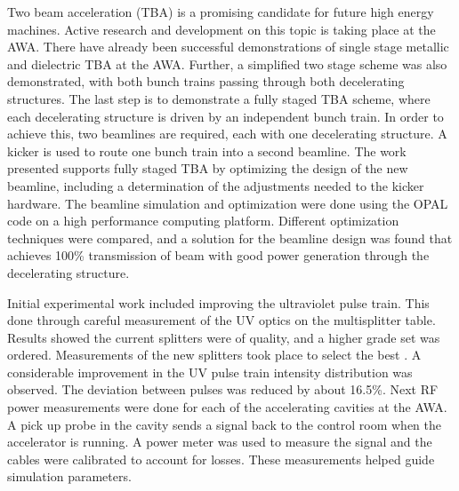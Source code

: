 
Two beam acceleration (TBA) is a promising candidate for future high energy machines. Active research and development on this topic is taking place at the AWA. There have already been successful demonstrations of single stage metallic and dielectric 
TBA at the AWA. Further, a simplified two stage scheme was also demonstrated, with both bunch trains passing through both decelerating structures. 
The last step is to demonstrate a fully staged TBA scheme, where each decelerating structure is driven by an independent bunch train.  In order to achieve this, two beamlines are required, each with one decelerating structure.   A kicker is used to route one bunch train into a second beamline. The work presented supports fully staged TBA by optimizing the design of the new beamline, including a determination of the adjustments needed to the kicker hardware.  The beamline simulation and optimization were done using the OPAL code on a high performance computing platform.  Different optimization techniques were compared, and a solution for the beamline design was found that achieves 100\% transmission of beam with good power generation through the decelerating structure. 

Initial experimental work included improving the ultraviolet pulse train. This  done through careful measurement of the UV optics on the multisplitter table. Results showed the current splitters were of  quality, and a higher grade set was ordered. Measurements of the new splitters  took place 
to select the best . 
A considerable improvement in the UV pulse train intensity distribution was observed. The deviation between pulses was reduced by about 16.5\%.
Next RF power measurements were done for each of the accelerating 
cavities at the AWA. A pick up probe in the cavity sends a signal back to the control room when the accelerator is running. A power meter was used to measure the signal and the cables were calibrated to account for losses.  These measurements helped guide simulation parameters.  

